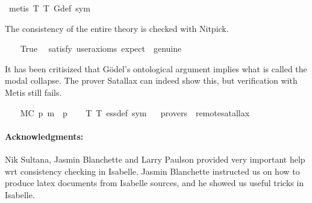 \begin{isabellebody}
\ {\isacharparenleft}metis\ T{}\ T{}\ G{\isacharunderscore}def\ sym{\isacharparenright}%
\endisatagproof
{\isafoldproof}%
%
\isadelimproof
%
\endisadelimproof
%
\begin{isamarkuptext}%
The consistency of the entire theory is checked with Nitpick.%
\end{isamarkuptext}%
\isamarkuptrue%
\ \ \isamarkupfalse%
\ True\ \isamarkupfalse%
\ {\isacharbrackleft}satisfy{\isacharcomma}\ user{\isacharunderscore}axioms{\isacharcomma}\ expect\ {\isacharequal}\ genuine{\isacharbrackright}%
\isadelimproof
\ %
\endisadelimproof
%
\isatagproof
{}\isamarkupfalse%
%
\endisatagproof
{\isafoldproof}%
%
\isadelimproof
%
\endisadelimproof
%
\begin{isamarkuptext}%
It has been critisized that G\"odel's ontological argument implies what is called the 
modal collapse. The prover Satallax \cite{Satallax} can indeed show this, but verification with 
Metis still fails.%
\end{isamarkuptext}%
\isamarkuptrue%
\ \ \isamarkupfalse%
\ MC{\isacharcolon}\ {\isachardoublequoteopen}{\isacharbrackleft}p\ m{\isasymRightarrow}\ {\isacharparenleft}{\isasymbox}\ p{\isacharparenright}{\isacharbrackright}{\isachardoublequoteclose}\isanewline
%
\isadelimproof
\ \ %
\endisadelimproof
%
\isatagproof
{}\isamarkupfalse%
\ T{}\ T{}\ ess{\isacharunderscore}def\ sym%
\endisatagproof
{\isafoldproof}%
%
\isadelimproof
%
\endisadelimproof
\ \isamarkupfalse%
\ {\isacharbrackleft}provers\ {\isacharequal}\ remote{\isacharunderscore}satallax{\isacharbrackright}%
\isadelimproof
\ %
\endisadelimproof
%
\isatagproof
{}\isamarkupfalse%
%
\endisatagproof
{\isafoldproof}%
%
\isadelimproof
%
\endisadelimproof
%
\begin{isamarkuptext}%
\paragraph{Acknowledgments:} Nik Sultana, Jasmin Blanchette and Larry Paulson provided 
very important help wrt consistency checking in Isabelle. Jasmin Blanchette instructed us on how to 
produce latex documents from Isabelle sources, and he showed us useful tricks in Isabelle.%
\end{isamarkuptext}%
\isamarkuptrue%
%
\isadelimtheory
%
\endisadelimtheory
%
\isatagtheory
%
\endisatagtheory
{\isafoldtheory}%
%
\isadelimtheory
%
\endisadelimtheory
\ \end{isabellebody}%
